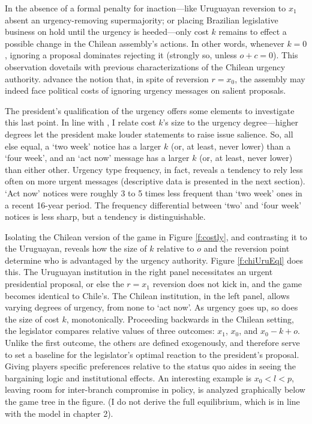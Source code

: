 \documentclass[letter,12pt]{article}
\begin{document}
In the absence of a formal penalty for inaction---like Uruguayan reversion to $x_1$ absent an urgency-removing supermajority; or placing Brazilian legislative business on hold until the urgency is heeded---only cost $k$ remains to effect a possible change in the Chilean assembly's actions. In other words, whenever $k=0$, ignoring a proposal dominates rejecting it (strongly so, unless $o+c=0$). This observation dovetails with previous characterizations of the Chilean urgency authority. \citet{berrios.gamboa.fiscChile.2006} advance the notion that, in spite of reversion $r=x_0$, the assembly may indeed face political costs of ignoring urgency messages on salient proposals. 

The president's qualification of the urgency offers some elements to investigate this last point. In line with \citet{aleman.navia.UrgChi.2009}, I relate cost $k$'s size to the urgency degree---higher degrees let the president make louder statements to raise issue salience. So, all else equal, a `two week' notice has a larger $k$ (or, at least, never lower) than a `four week', and an `act now' message has a larger $k$ (or, at least, never lower) than either other. Urgency type frequency, in fact, reveals a tendency to rely less often on more urgent messages (descriptive data is presented in the next section). `Act now' notices were roughly 3 to 5 times less frequent than `two week' ones in a recent 16-year period. The frequency differential between `two' and `four week' notices is less sharp, but a tendency is distinguishable. 

Isolating the Chilean version of the game in Figure \ref{f:costly}, and contrasting it to the Uruguayan, reveals how the size of $k$ relative to $o$ and the reversion point determine who is advantaged by the urgency authority. Figure \ref{f:chiUruEql} does this. The Uruguayan institution in the right panel necessitates an urgent presidential proposal, or else the $r=x_1$ reversion does not kick in, and the game becomes identical to Chile's. The Chilean institution, in the left panel, allows varying degrees of urgency, from none to `act now'. As urgency goes up, so does the size of cost $k$, monotonically. Proceeding backwards in the Chilean setting, the legislator compares relative values of three outcomes: $x_1$, $x_0$, and $x_0-k+o$. Unlike the first outcome, the others are defined exogenously, and therefore serve to set a baseline for the legislator's optimal reaction to the president's proposal. Giving players specific preferences relative to the status quo aides in seeing the bargaining logic and institutional effects. An interesting example is $x_0 < l < p$, leaving room for inter-branch compromise in policy, is analyzed graphically below the game tree in the figure. (I do not derive the full equilibrium, which is in line with the model in chapter 2). 
\end{document}
